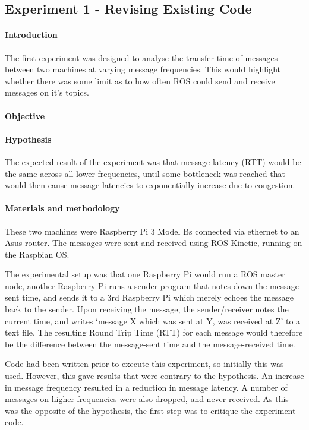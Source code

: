 \documentclass[../dissertation.tex]{subfiles}
\begin{document}
\subsection{Experiment 1 - Revising Existing Code}

\paragraph{Introduction} The first experiment was designed to analyse the transfer time of messages between two machines at varying message frequencies. This would highlight whether there was some limit as to how often ROS could send and receive messages on it's topics.

\paragraph{Objective}


\paragraph{Hypothesis} The expected result of the experiment was that message latency (RTT) would be the same across all lower frequencies, until some bottleneck was reached that would then cause message latencies to exponentially increase due to congestion.

\paragraph{Materials and methodology} These two machines were Raspberry Pi 3 Model Bs connected via ethernet to an Asus router. The messages were sent and received using ROS Kinetic, running on the Raspbian OS.

The experimental setup was that one Raspberry Pi would run a ROS master node, another Raspberry Pi runs a sender program that notes down the message-sent time, and sends it to a 3rd Raspberry Pi which merely echoes the message back to the sender. Upon receiving the message, the sender/receiver notes the current time, and writes `message X which was sent at Y, was received at Z' to a text file. The resulting Round Trip Time (RTT) for each message would therefore be the difference between the message-sent time and the message-received time.

Code had been written prior to execute this experiment, so initially this was used\cite{Experiment1InitialCode}. However, this gave results that were contrary to the hypothesis. An increase in message frequency resulted in a reduction in message latency. A number of messages on higher frequencies were also dropped, and never received. As this was the opposite of the hypothesis, the first step was to critique the experiment code.
\end{document}
